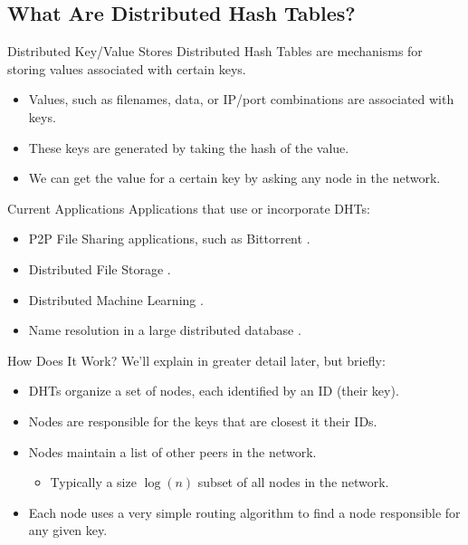 \documentclass[11pt,aspectratio=169]{beamer}
\begin{document}
\subsection{What Are Distributed Hash Tables?}

\begin{frame}{Distributed Key/Value Stores}
	Distributed Hash Tables are mechanisms for storing values associated with certain keys.
	\begin{itemize}
		\item Values, such as filenames, data, or IP/port combinations are associated with keys.
		\item These keys are generated by taking the hash of the value.
		\item We can get the value for a certain key by asking any node in the network.
	\end{itemize}
\end{frame}


\begin{frame}{Current Applications}
	Applications that use or incorporate DHTs:
	\begin{itemize}
		\item P2P File Sharing applications, such as Bittorrent \cite{bittorrent} \cite{mainline}.
		\item Distributed File Storage \cite{CFS}.
		\item Distributed Machine Learning \cite{liparameter}.
		\item Name resolution in a large distributed database \cite{Mateescu2011440}.
	\end{itemize}
\end{frame}


\begin{frame}{How Does It Work?}
	We'll explain in greater detail later, but briefly:
	\begin{itemize}
		\item DHTs organize a set of nodes, each identified by an \alert{ID} (their key). 
		\item Nodes are responsible for the keys that are closest it their IDs.
		\item Nodes maintain a list of other peers in the network.
		\begin{itemize}
			\item Typically a size $ \log(n)$ subset of all nodes in the network.
		\end{itemize}
		\item Each node uses a very simple routing algorithm to find a node responsible for any given key.  %
	\end{itemize}
\end{frame}
\end{document}
